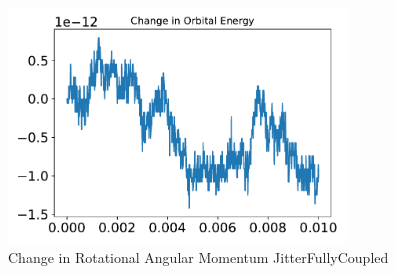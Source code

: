 \begin{figure}[htbp]\centerline{\includegraphics[width=0.80\textwidth]{AutoTeX/ChangeInRotationalAngularMomentumJitterFullyCoupled}}\caption{Change in Rotational Angular Momentum JitterFullyCoupled}\label{fig:ChangeInRotationalAngularMomentumJitterFullyCoupled}\end{figure}